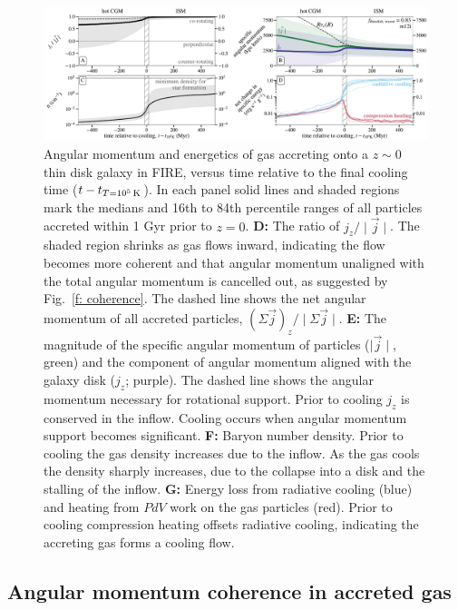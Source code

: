 \documentclass[fleqn,usenatbib]{mnras}
\newcommand{\tcon}{t_{T=10^5\,{\rm K}}}
\begin{document}
\begin{figure}
\includegraphics[width=\textwidth]{figures/before_and_after/before_and_after_m12i_md.pdf}
\caption{
Angular momentum and energetics of gas accreting onto a $z\sim0$ thin disk galaxy in FIRE, versus time relative to the final cooling time ($t - \tcon$).
In each panel solid lines and shaded regions mark the medians and 16th to 84th percentile ranges of all particles accreted within 1 Gyr prior to $z=0$.
\textbf{D:}
The ratio of $j_z / \mid \vec j \mid$.
The shaded region shrinks as gas flows inward, indicating the flow becomes more coherent and that angular momentum unaligned with the total angular momentum is cancelled out, as suggested by Fig.~\ref{f: coherence}. The dashed line shows the net angular momentum of all accreted particles, $(\Sigma \vec j)_z / \mid \Sigma \vec j \mid$.
\textbf{E:}
The magnitude of the specific angular momentum of particles ($\mid\vec{j}\mid$, green) and the component of angular momentum aligned with the galaxy disk ($j_z$; purple).
The dashed line shows the angular momentum necessary for rotational support.
Prior to cooling $j_z$ is conserved in the inflow. Cooling occurs when angular momentum support becomes significant.
\textbf{F:}
Baryon number density.
Prior to cooling the gas density increases due to the inflow. As the gas cools the density sharply increases, due to the collapse into a disk and the stalling of the inflow. 
\textbf{G:}
Energy loss from radiative cooling (blue) and heating from $PdV$ work on the gas particles (red).
Prior to cooling compression heating offsets radiative cooling, indicating the accreting gas forms a cooling flow.
}
\label{f: before and after}
\end{figure}




\subsection{Angular momentum coherence in accreted gas}
\label{s: mechanics -- coherence}
\end{document}
